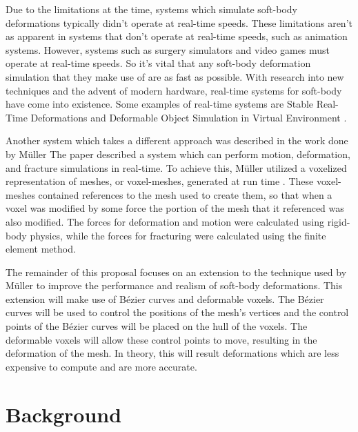 Due to the limitations at the time, systems which simulate soft-body deformations typically didn't
operate at real-time speeds. These limitations aren't as apparent in systems that don't operate at
real-time speeds, such as animation systems. However, systems such as surgery simulators and video
games must operate at real-time speeds. So it's vital that any soft-body deformation simulation that
they make use of are as fast as possible. With research into new techniques and the advent of modern
hardware, real-time systems for soft-body have come into existence. Some examples of real-time 
systems are Stable Real-Time Deformations \cite{Stable-Real-Time-Deformations} and Deformable Object 
Simulation in Virtual Environment \cite{Deformable-Object-Simulation-in-Virtual-Environment}.

Another system which takes a different approach was described in the work done by Müller \etal The 
paper described a system which can perform motion, deformation, and fracture 
simulations in real-time. To achieve this, Müller \etal utilized a voxelized representation of 
meshes, or voxel-meshes, generated at run time \cite{Muller_Teschner_Gross}. These voxel-meshes 
contained references
to the mesh used to create them, so that when a voxel  was modified by some force the portion of 
the mesh that it referenced was also modified. The forces for deformation and motion were calculated 
using rigid-body physics, while the forces for fracturing were calculated using the finite element 
method. 

The remainder of this proposal focuses on an extension to the technique used by Müller \etal
to improve the performance and realism of soft-body deformations. This extension will make use of 
Bézier curves and deformable voxels. The Bézier curves will be used to control the positions of the
mesh's vertices and the control points of the Bézier curves will be placed on the hull of the voxels.
The deformable voxels will allow these control points to move, resulting in the deformation of the 
mesh. In theory, this will result deformations which are less expensive to compute and are more 
accurate.

\section{Background}

